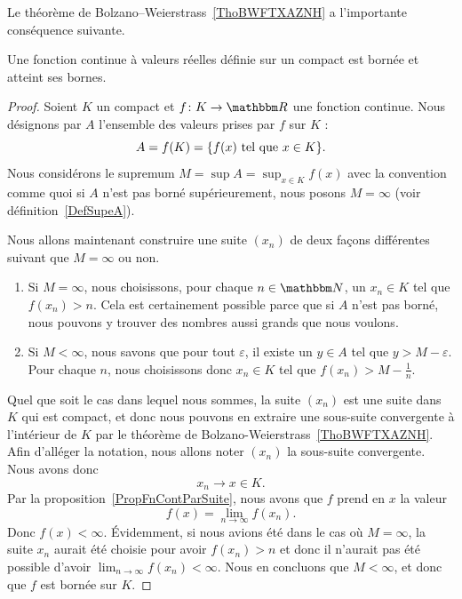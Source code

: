 Le théorème de Bolzano–Weierstrass~\ref{ThoBWFTXAZNH} a l'importante conséquence suivante.
\begin{theorem}[Weierstrass]		\label{ThoWeirstrassRn}
	Une fonction continue à valeurs réelles définie sur un compact est bornée et atteint ses bornes.
\end{theorem}

\begin{proof}
	Soient \( K\) un compact et $f\colon K\to \eR$ une fonction continue. Nous désignons par $A$ l'ensemble des valeurs prises par $f$ sur $K$ :
	\begin{equation}
		A=f(K)=\{ f(x)\text{ tel que } x\in K \}.
	\end{equation}
	Nous considérons le supremum $M=\sup A=\sup_{x\in K}f(x)$ avec la convention comme quoi si $A$ n'est pas borné supérieurement, nous posons $M=\infty$ (voir définition~\ref{DefSupeA}).

	Nous allons maintenant construire une suite $(x_n)$ de deux façons différentes suivant que $M=\infty$ ou non.
	\begin{enumerate}
		\item
			Si $M=\infty$, nous choisissons, pour chaque $n\in\eN$, un $x_n\in K$ tel que $f(x_n)>n$. Cela est certainement possible parce que si $A$ n'est pas borné, nous pouvons y trouver des nombres aussi grands que nous voulons.
		\item
			Si $M<\infty$, nous savons que pour tout $\varepsilon$, il existe un $y\in A$ tel que $y>M-\varepsilon$. Pour chaque $n$, nous choisissons donc $x_n\in K$ tel que $f(x_n)>M-\frac{1}{ n }$.
	\end{enumerate}
    Quel que soit le cas dans lequel nous sommes, la suite $(x_n)$ est une suite dans $K$ qui est compact, et donc nous pouvons en extraire une sous-suite convergente à l'intérieur de \( K\) par le théorème de Bolzano-Weierstrass~\ref{ThoBWFTXAZNH}. Afin d'alléger la notation, nous allons noter $(x_n)$ la sous-suite convergente. Nous avons donc
	\begin{equation}
		x_n\to x\in K.
	\end{equation}
	Par la proposition~\ref{PropFnContParSuite}, nous avons que $f$ prend en \( x\) la valeur
	\begin{equation}
		f(x)=\lim_{n\to \infty} f(x_n).
	\end{equation}
	Donc $f(x)<\infty$. Évidemment, si nous avions été dans le cas où $M=\infty$, la suite $x_n$ aurait été choisie pour avoir $f(x_n)>n$ et donc il n'aurait pas été possible d'avoir $\lim_{n\to \infty} f(x_n)<\infty$. Nous en concluons que $M<\infty$, et donc que $f$ est bornée sur $K$.


\end{proof}
